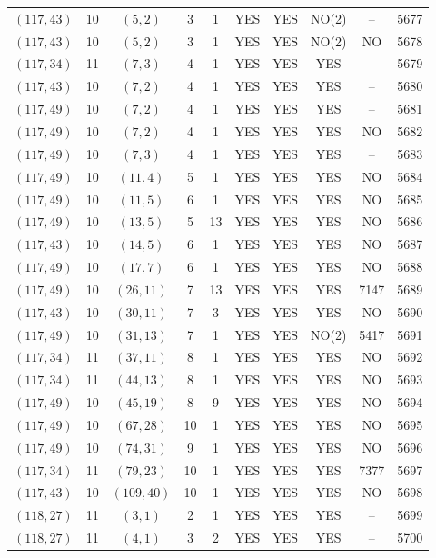 \begin{longtable}{|c|c|c|c|c|c|c|c|c|c|}
$(117, 43)$ & 10 & $(5, 2)$ & 3 & 1 & YES & YES & NO(2) & -- & 5677\\
$(117, 43)$ & 10 & $(5, 2)$ & 3 & 1 & YES & YES & NO(2) & NO & 5678\\
$(117, 34)$ & 11 & $(7, 3)$ & 4 & 1 & YES & YES & YES & -- & 5679\\
$(117, 43)$ & 10 & $(7, 2)$ & 4 & 1 & YES & YES & YES & -- & 5680\\
$(117, 49)$ & 10 & $(7, 2)$ & 4 & 1 & YES & YES & YES & -- & 5681\\
$(117, 49)$ & 10 & $(7, 2)$ & 4 & 1 & YES & YES & YES & NO & 5682\\
$(117, 49)$ & 10 & $(7, 3)$ & 4 & 1 & YES & YES & YES & -- & 5683\\
$(117, 49)$ & 10 & $(11, 4)$ & 5 & 1 & YES & YES & YES & NO & 5684\\
$(117, 49)$ & 10 & $(11, 5)$ & 6 & 1 & YES & YES & YES & NO & 5685\\
$(117, 49)$ & 10 & $(13, 5)$ & 5 & 13 & YES & YES & YES & NO & 5686\\
$(117, 43)$ & 10 & $(14, 5)$ & 6 & 1 & YES & YES & YES & NO & 5687\\
$(117, 49)$ & 10 & $(17, 7)$ & 6 & 1 & YES & YES & YES & NO & 5688\\
$(117, 49)$ & 10 & $(26, 11)$ & 7 & 13 & YES & YES & YES & 7147 & 5689\\
$(117, 43)$ & 10 & $(30, 11)$ & 7 & 3 & YES & YES & YES & NO & 5690\\
$(117, 49)$ & 10 & $(31, 13)$ & 7 & 1 & YES & YES & NO(2) & 5417 & 5691\\
$(117, 34)$ & 11 & $(37, 11)$ & 8 & 1 & YES & YES & YES & NO & 5692\\
$(117, 34)$ & 11 & $(44, 13)$ & 8 & 1 & YES & YES & YES & NO & 5693\\
$(117, 49)$ & 10 & $(45, 19)$ & 8 & 9 & YES & YES & YES & NO & 5694\\
$(117, 49)$ & 10 & $(67, 28)$ & 10 & 1 & YES & YES & YES & NO & 5695\\
$(117, 49)$ & 10 & $(74, 31)$ & 9 & 1 & YES & YES & YES & NO & 5696\\
$(117, 34)$ & 11 & $(79, 23)$ & 10 & 1 & YES & YES & YES & 7377 & 5697\\
$(117, 43)$ & 10 & $(109, 40)$ & 10 & 1 & YES & YES & YES & NO & 5698\\
$(118, 27)$ & 11 & $(3, 1)$ & 2 & 1 & YES & YES & YES & -- & 5699\\
$(118, 27)$ & 11 & $(4, 1)$ & 3 & 2 & YES & YES & YES & -- & 5700\\

\end{longtable}
